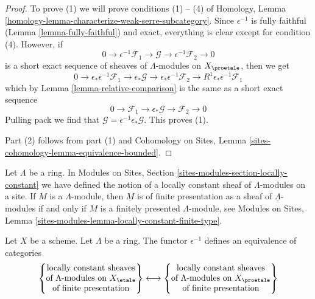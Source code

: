 \begin{proof}
To prove (1) we will prove conditions (1) -- (4) of
Homology, Lemma \ref{homology-lemma-characterize-weak-serre-subcategory}.
Since $\epsilon^{-1}$ is fully faithful (Lemma \ref{lemma-fully-faithful})
and exact, everything is clear except for condition (4).
However, if
$$
0 \to \epsilon^{-1}\mathcal{F}_1 \to \mathcal{G} \to
\epsilon^{-1}\mathcal{F}_2 \to 0
$$
is a short exact sequence of sheaves of $\Lambda$-modules on $X_\proetale$,
then we get
$$
0 \to \epsilon_*\epsilon^{-1}\mathcal{F}_1 \to \epsilon_*\mathcal{G} \to
\epsilon_*\epsilon^{-1}\mathcal{F}_2 \to
R^1\epsilon_*\epsilon^{-1}\mathcal{F}_1
$$
which by Lemma \ref{lemma-relative-comparison}
is the same as a short exact sequence
$$
0 \to \mathcal{F}_1 \to \epsilon_*\mathcal{G} \to \mathcal{F}_2 \to 0
$$
Pulling pack we find that $\mathcal{G} = \epsilon^{-1}\epsilon_*\mathcal{G}$.
This proves (1).

\medskip\noindent
Part (2) follows from part (1) and Cohomology on Sites,
Lemma \ref{sites-cohomology-lemma-equivalence-bounded}.
\end{proof}

\noindent
Let $\Lambda$ be a ring. In
Modules on Sites, Section \ref{sites-modules-section-locally-constant}
we have defined the notion of a locally constant sheaf of $\Lambda$-modules
on a site. If $M$ is a $\Lambda$-module, then $\underline{M}$ is of finite
presentation as a sheaf of $\underline{\Lambda}$-modules if and only
if $M$ is a finitely presented $\Lambda$-module, see
Modules on Sites, Lemma \ref{sites-modules-lemma-locally-constant-finite-type}.

\begin{lemma}
\label{lemma-compare-locally-constant}
Let $X$ be a scheme. Let $\Lambda$ be a ring.
The functor $\epsilon^{-1}$ defines an equivalence of categories
$$
\left\{
\begin{matrix}
\text{locally constant sheaves}\\
\text{of }\Lambda\text{-modules on }X_\etale\\
\text{of finite presentation}
\end{matrix}
\right\}
\longleftrightarrow
\left\{
\begin{matrix}
\text{locally constant sheaves}\\
\text{of }\Lambda\text{-modules on }X_\proetale\\
\text{of finite presentation}
\end{matrix}
\right\}
$$
\end{lemma}

